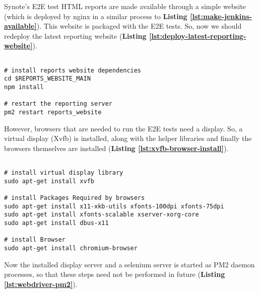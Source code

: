 Synote's E2E test HTML reports are made available through a simple website (which is deployed by nginx in a similar process to \textbf{Listing \ref{lst:make-jenkins-available}}). This website is packaged with the E2E tests. So, now we should redeploy the latest reporting website (\textbf{Listing \ref{lst:deploy-latest-reporting-website}}).

\begin{listing}[H]
\begin{verbatim}

# install reports website dependencies
cd $REPORTS_WEBSITE_MAIN
npm install

# restart the reporting server
pm2 restart reports_website

\end{verbatim}
\label{lst:deploy-latest-reporting-website}
\end{listing}

However, browsers that are needed to run the E2E tests need a display. So, a virtual display (Xvfb) is installed, along with the helper libraries and finally the browsers themselves are installed (\textbf{Listing \ref{lst:xvfb-browser-install}}).

\begin{listing}[H]
\begin{verbatim}

# install virtual display library
sudo apt-get install xvfb

# install Packages Required by browsers
sudo apt-get install x11-xkb-utils xfonts-100dpi xfonts-75dpi
sudo apt-get install xfonts-scalable xserver-xorg-core
sudo apt-get install dbus-x11

# install Browser
sudo apt-get install chromium-browser

\end{verbatim}
\label{lst:xvfb-browser-install}
\end{listing}

Now the installed display server and a selenium server is started as PM2 daemon processes, so that these steps need not be performed in future (\textbf{Listing \ref{lst:webdriver-pm2}}).

